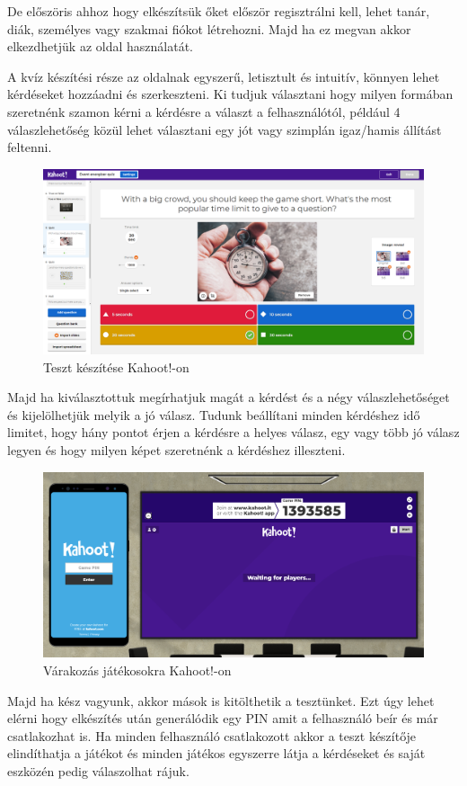 De előszöris ahhoz hogy elkészítsük őket először regisztrálni kell, lehet tanár, diák, személyes vagy szakmai fiókot létrehozni. Majd ha ez megvan akkor elkezdhetjük az oldal használatát.

A kvíz készítési része az oldalnak egyszerű, letisztult és intuitív, könnyen lehet kérdéseket hozzáadni és szerkeszteni. Ki tudjuk választani hogy milyen formában szeretnénk szamon kérni a kérdésre a választ a felhasználótól, például 4 válaszlehetőség közül lehet választani egy jót vagy szimplán igaz/hamis állítást feltenni.

\begin{figure}[h]
  \centering
  \includegraphics[width=\linewidth]{images/kahoot_test_making.PNG}
  \caption{Teszt készítése Kahoot!-on}
\end{figure}

Majd ha kiválasztottuk megírhatjuk magát a kérdést és a négy válaszlehetőséget és kijelölhetjük melyik a jó válasz. Tudunk beállítani minden kérdéshez idő limitet, hogy hány pontot érjen a kérdésre a helyes válasz, egy vagy több jó válasz legyen és hogy milyen képet szeretnénk a kérdéshez illeszteni.


\begin{figure}[h]
  \centering
  \includegraphics[width=\textwidth]{images/kahoot_play.png}
  \caption{Várakozás játékosokra Kahoot!-on}
\end{figure}
Majd ha kész vagyunk, akkor mások is kitölthetik a tesztünket. Ezt úgy lehet elérni hogy elkészítés után generálódik egy PIN amit a felhasználó beír és már csatlakozhat is. Ha minden felhasználó csatlakozott akkor a teszt készítője elindíthatja a játékot és minden játékos egyszerre látja a kérdéseket és saját eszközén pedig válaszolhat rájuk.


